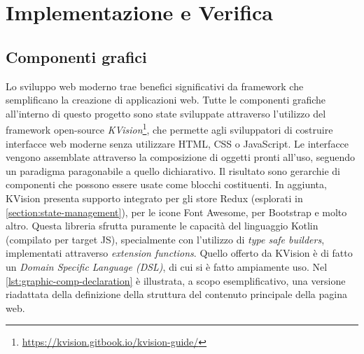 \chapter{Implementazione e Verifica}

\section{Componenti grafici}
Lo sviluppo web moderno trae benefici significativi da framework che semplificano la creazione di applicazioni web. Tutte le componenti grafiche all'interno di questo progetto sono state sviluppate attraverso l'utilizzo del framework open-source \textit{KVision}\footnote{\url{https://kvision.gitbook.io/kvision-guide/}}, che permette agli sviluppatori di costruire interfacce web moderne senza utilizzare HTML, CSS o JavaScript. Le interfacce vengono assemblate attraverso la composizione di oggetti pronti all'uso, seguendo un paradigma paragonabile a quello dichiarativo. Il risultato sono gerarchie di componenti che possono essere usate come blocchi costituenti. In aggiunta, KVision presenta supporto integrato per gli store Redux (esplorati in \cref{section:state-management}), per le icone Font Awesome, per Bootstrap e molto altro. Questa libreria sfrutta puramente le capacità del linguaggio Kotlin (compilato per target JS), specialmente con l'utilizzo di \textit{type safe builders}, implementati attraverso \textit{extension functions}. Quello offerto da KVision è di fatto un \textit{Domain Specific Language (DSL)}, di cui si è fatto ampiamente uso.
Nel \cref{lst:graphic-comp-declaration} è illustrata, a scopo esemplificativo, una versione riadattata della definizione della struttura del contenuto principale della pagina web.



